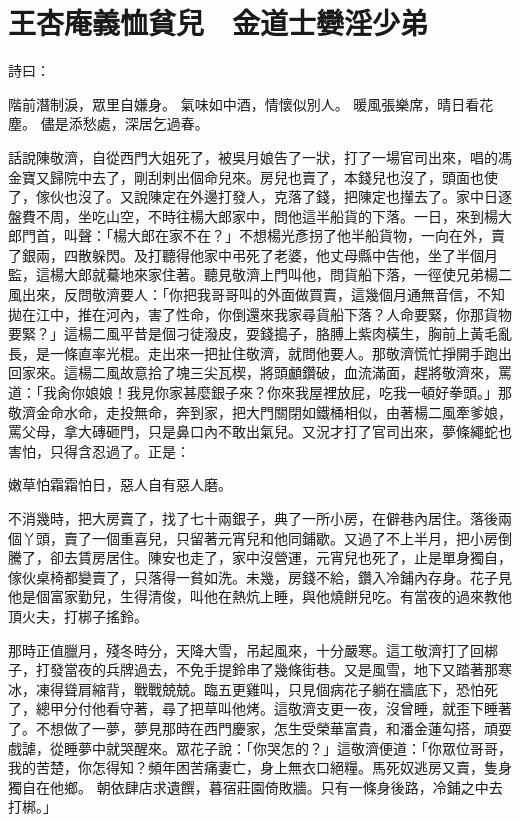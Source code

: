 %

\chapter{王杏庵義恤貧兒　金道士孌淫少弟}

詩曰：

階前潛制淚，眾里自嫌身。
氣味如中酒，情懷似別人。
暖風張樂席，晴日看花塵。
儘是添愁處，深居乞過春。

話說陳敬濟，自從西門大姐死了，被吳月娘告了一狀，打了一場官司出來，唱的馮金寶又歸院中去了，剛刮剌出個命兒來。房兒也賣了，本錢兒也沒了，頭面也使了，傢伙也沒了。又說陳定在外邊打發人，克落了錢，把陳定也攆去了。家中日逐盤費不周，坐吃山空，不時往楊大郎家中，問他這半船貨的下落。一日，來到楊大郎門首，叫聲：「楊大郎在家不在？」不想楊光彥拐了他半船貨物，一向在外，賣了銀兩，四散躲閃。及打聽得他家中弔死了老婆，他丈母縣中告他，坐了半個月監，這楊大郎就驀地來家住著。聽見敬濟上門叫他，問貨船下落，一徑使兄弟楊二風出來，反問敬濟要人：「你把我哥哥叫的外面做買賣，這幾個月通無音信，不知拋在江中，推在河內，害了性命，你倒還來我家尋貨船下落？人命要緊，你那貨物要緊？」這楊二風平昔是個刁徒潑皮，耍錢搗子，胳膊上紫肉橫生，胸前上黃毛亂長，是一條直率光棍。走出來一把扯住敬濟，就問他要人。那敬濟慌忙掙開手跑出回家來。這楊二風故意拾了塊三尖瓦楔，將頭顱鑽破，血流滿面，趕將敬濟來，罵道：「我肏你娘娘！我見你家甚麼銀子來？你來我屋裡放屁，吃我一頓好拳頭。」那敬濟金命水命，走投無命，奔到家，把大門關閉如鐵桶相似，由著楊二風牽爹娘，罵父母，拿大磚砸門，只是鼻口內不敢出氣兒。又況才打了官司出來，夢條繩蛇也害怕，只得含忍過了。正是：

嫩草怕霜霜怕日，惡人自有惡人磨。

不消幾時，把大房賣了，找了七十兩銀子，典了一所小房，在僻巷內居住。落後兩個丫頭，賣了一個重喜兒，只留著元宵兒和他同鋪歇。又過了不上半月，把小房倒騰了，卻去賃房居住。陳安也走了，家中沒營運，元宵兒也死了，止是單身獨自，傢伙桌椅都變賣了，只落得一貧如洗。未幾，房錢不給，鑽入冷鋪內存身。花子見他是個富家勤兒，生得清俊，叫他在熱炕上睡，與他燒餅兒吃。有當夜的過來教他頂火夫，打梆子搖鈴。

那時正值臘月，殘冬時分，天降大雪，吊起風來，十分嚴寒。這工敬濟打了回梆子，打發當夜的兵牌過去，不免手提鈴串了幾條街巷。又是風雪，地下又踏著那寒冰，凍得聳肩縮背，戰戰兢兢。臨五更雞叫，只見個病花子躺在牆底下，恐怕死了，總甲分付他看守著，尋了把草叫他烤。這敬濟支更一夜，沒曾睡，就歪下睡著了。不想做了一夢，夢見那時在西門慶家，怎生受榮華富貴，和潘金蓮勾搭，頑耍戲謔，從睡夢中就哭醒來。眾花子說：「你哭怎的？」這敬濟便道：「你眾位哥哥，我的苦楚，你怎得知？頻年困苦痛妻亡，身上無衣口絕糧。馬死奴逃房又賣，隻身獨自在他鄉。 朝依肆店求遺饌，暮宿莊園倚敗牆。只有一條身後路，冷鋪之中去打梆。」

